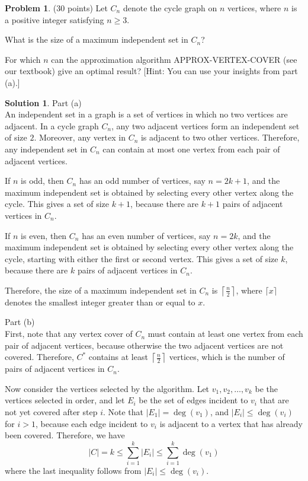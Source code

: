 \documentclass{article}
\theoremstyle{definition}
\newtheorem{problem}{Problem}
\newtheorem*{solution}{Solution}
\begin{document}
\clearpage
\begin{problem} (30 points) 
Let $C_n$ denote the cycle graph on $n$ vertices, where $n$ is a
positive integer satisfying $n\ge 3$.
\begin{compactenum}[(a)]
\item What is the size of a maximum independent set in $C_n$?
\item For which $n$ can the approximation algorithm 
APPROX-VERTEX-COVER (see our textbook) give an optimal result?
[Hint: You can use your insights from part (a).] 
\end{compactenum}
\end{problem}
\noindent
\begin{solution}
Part (a)\\
An independent set in a graph is a set of vertices in which no two vertices are adjacent. 
In a cycle graph $C_n$, any two adjacent vertices form an independent set of size $2$. 
Moreover, any vertex in $C_n$ is adjacent to two other vertices. 
Therefore, any independent set in $C_n$ can contain at most one vertex from each pair of adjacent vertices.

\noindent
If $n$ is odd, then $C_n$ has an odd number of vertices, say $n=2k+1$, and the maximum independent set is obtained by selecting every other vertex along the cycle. 
This gives a set of size $k+1$, because there are $k+1$ pairs of adjacent vertices in $C_n$.

\noindent
If $n$ is even, then $C_n$ has an even number of vertices, say $n=2k$, and the maximum independent set is obtained by selecting every other vertex along the cycle, starting with either the first or second vertex. 
This gives a set of size $k$, because there are $k$ pairs of adjacent vertices in $C_n$.

\noindent
Therefore, the size of a maximum independent set in $C_n$ is $\displaystyle\left\lceil \frac{n}{2} \right\rceil$, where $\lceil x \rceil$ denotes the smallest integer greater than or equal to $x$.

\noindent
Part (b)\\
First, note that any vertex cover of $C_n$ must contain at least one vertex from each pair of adjacent vertices, because otherwise the two adjacent vertices are not covered.
Therefore, $C^*$ contains at least $\displaystyle\left\lceil \frac{n}{2} \right\rceil$ vertices, which is the number of pairs of adjacent vertices in $C_n$.

\noindent
Now consider the vertices selected by the algorithm.
Let $v_1,v_2,\ldots,v_k$ be the vertices selected in order, and let $E_i$ be the set of edges incident to $v_i$ that are not yet covered after step $i$.
Note that $|E_1|=\operatorname{deg}(v_1)$, and $|E_i|\le\operatorname{deg}(v_i)$ for $i>1$, because each edge incident to $v_i$ is adjacent to a vertex that has already been covered.
Therefore, we have
\[
|C|=k\leq\sum_{i=1}^{k}|E_i|\leq\sum_{i=1}^{k}\operatorname{deg}(v_1)
\]
where the last inequality follows from $|E_i| \le \operatorname{deg}(v_i)$.


\end{solution}
\end{document}
